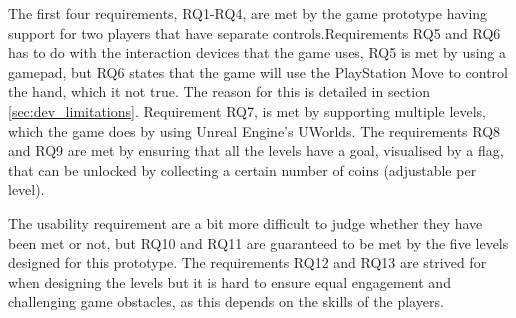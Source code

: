 The first four requirements, RQ1-RQ4, are met by the game prototype having support for two players that have separate controls.Requirements RQ5 and RQ6 has to do with the interaction devices that the game uses, RQ5 is met by using a gamepad, but RQ6 states that the game will use the PlayStation Move to control the hand, which it not true. The reason for this is detailed in section \ref{sec:dev_limitations}. Requirement RQ7, is met by supporting multiple levels, which the game does by using Unreal Engine's UWorlds. The requirements RQ8 and RQ9 are met by ensuring that all the levels have a goal, visualised by a flag, that can be unlocked by collecting a certain number of coins (adjustable per level).

The usability requirement are a bit more difficult to judge whether they have been met or not, but RQ10 and RQ11 are guaranteed to be met by the five levels designed for this prototype. The requirements RQ12 and RQ13 are strived for when designing the levels but it is hard to ensure equal engagement and challenging game obstacles, as this depends on the skills of the players.


